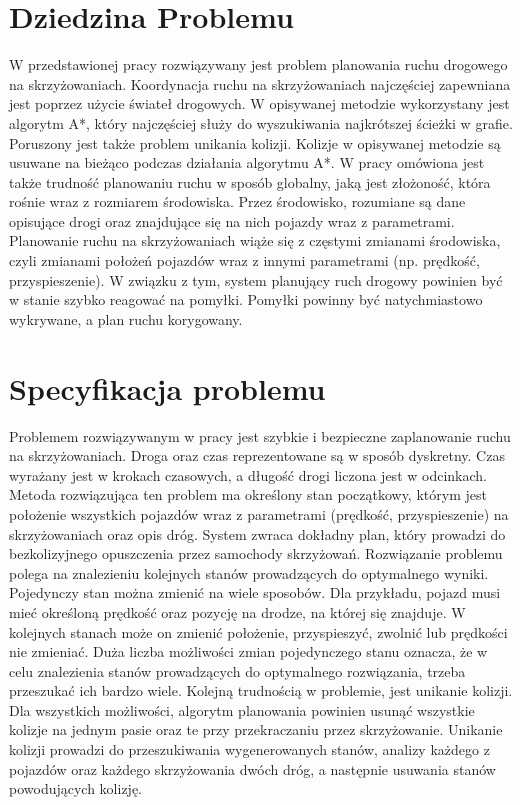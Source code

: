 
\section{Dziedzina Problemu}

W przedstawionej pracy rozwiązywany jest problem planowania ruchu drogowego na skrzyżowaniach. Koordynacja ruchu na skrzyżowaniach najczęściej zapewniana jest poprzez użycie świateł drogowych. W opisywanej metodzie wykorzystany jest algorytm A*, który najczęściej służy do wyszukiwania najkrótszej ścieżki w grafie. Poruszony jest także problem unikania kolizji. Kolizje w opisywanej metodzie są usuwane na bieżąco podczas działania algorytmu A*.
\newline
\indent
W pracy omówiona jest także trudność planowaniu ruchu w sposób globalny, jaką jest złożoność, która rośnie wraz z rozmiarem środowiska. Przez środowisko, rozumiane są dane opisujące drogi oraz znajdujące się na nich pojazdy wraz z parametrami. Planowanie ruchu na skrzyżowaniach wiąże się z częstymi zmianami środowiska, czyli zmianami położeń pojazdów wraz z innymi parametrami (np. prędkość, przyspieszenie). W związku z tym, system planujący ruch drogowy powinien być w stanie szybko reagować na pomyłki. Pomyłki powinny być natychmiastowo wykrywane, a plan ruchu korygowany.

\section{Specyfikacja problemu}

Problemem rozwiązywanym w pracy jest szybkie i bezpieczne zaplanowanie ruchu na skrzyżowaniach. Droga oraz czas reprezentowane są w sposób dyskretny. Czas wyrażany jest w krokach czasowych, a długość drogi liczona jest w odcinkach. Metoda rozwiązująca ten problem ma określony stan początkowy, którym jest położenie wszystkich pojazdów wraz z parametrami (prędkość, przyspieszenie) na skrzyżowaniach oraz opis dróg. System zwraca dokładny plan, który prowadzi do bezkolizyjnego opuszczenia przez samochody skrzyżowań. Rozwiązanie problemu polega na znalezieniu kolejnych stanów prowadzących do optymalnego wyniki. Pojedynczy stan można zmienić na wiele sposobów. Dla przykładu, pojazd musi mieć określoną prędkość oraz pozycję na drodze, na której się znajduje. W kolejnych stanach może on zmienić położenie, przyspieszyć, zwolnić lub prędkości nie zmieniać. Duża liczba możliwości zmian pojedynczego stanu oznacza, że w celu znalezienia stanów prowadzących do optymalnego rozwiązania, trzeba przeszukać ich bardzo wiele.
\newline
\indent
Kolejną trudnością w problemie, jest unikanie kolizji. Dla wszystkich możliwości, algorytm planowania powinien usunąć wszystkie kolizje na jednym pasie oraz te przy przekraczaniu przez skrzyżowanie. Unikanie kolizji prowadzi do przeszukiwania wygenerowanych stanów, analizy każdego z pojazdów oraz każdego skrzyżowania dwóch dróg, a następnie usuwania stanów powodujących kolizję.

